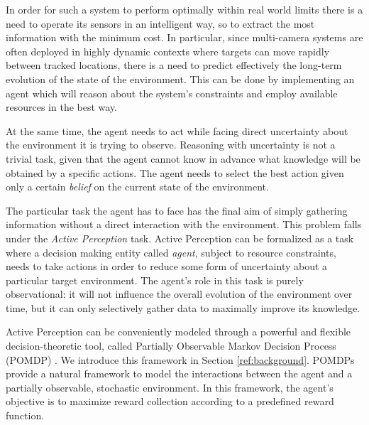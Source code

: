 In order for such a system to perform optimally within real world limits there is a need to operate
its sensors in an intelligent way, so to extract the most information with the minimum cost. In
particular, since multi-camera systems are often deployed in highly dynamic contexts where targets
can move rapidly between tracked locations, there is a need to predict effectively the long-term
evolution of the state of the environment. This can be done by implementing an agent which will
reason about the system's constraints and employ available resources in the best way.

At the same time, the agent needs to act while facing direct uncertainty about the environment it is
trying to observe. Reasoning with uncertainty is not a trivial task, given that the agent cannot
know in advance what knowledge will be obtained by a specific actions. The agent needs to select the
best action given only a certain \textit{belief} on the current state of the environment.


The particular task the agent has to face has the final aim of simply gathering information without
a direct interaction with the environment. This problem falls under the \textit{Active Perception}
task. Active Perception can be formalized as a task where a decision making entity called
\textit{agent}, subject to resource constraints, needs to take actions in order to reduce some form
of uncertainty about a particular target environment. The agent's role in this task is purely
observational: it will not influence the overall evolution of the environment over time, but it can
only selectively gather data to maximally improve its knowledge.


Active Perception can be conveniently modeled through a powerful and flexible decision-theoretic
tool, called Partially Observable Markov Decision Process (POMDP) \cite{cit:pomdp}. We introduce
this framework in Section \ref{ref:background}. POMDPs provide a natural framework to model the
interactions between the agent and a partially observable, stochastic environment.  In this
framework, the agent's objective is to maximize reward collection according to a predefined reward
function.

